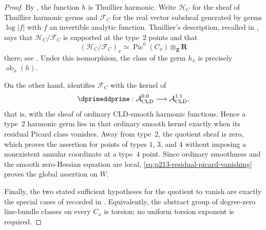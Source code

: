 \begin{proof}
By , the function \(h\) is
Thuillier harmonic.  Write \(\mathcal H_C\) for the sheaf of Thuillier
harmonic germs and \(\mathcal F_C\) for the real vector subsheaf generated
by germs \(\log|f|\) with \(f\) an invertible analytic function.  Thuillier's
description, recalled in , says that
\(\mathcal H_C/\mathcal F_C\) is supported at the type~\(2\) points and
that
\[
       (\mathcal H_C/\mathcal F_C)_x
       \simeq\operatorname{Pic}^0(C_x)\otimes_{\mathbf Z}\mathbf R
\]
there; see \cite[Theorem~2.3.21 and Lemma~2.3.22]{Thu05}.  Under this
isomorphism, the class of the germ \(h_x\) is precisely
\(\operatorname{ob}_x(h)\).

On the other hand, \cite[Remark~15.10]{GJR26} identifies
\(\mathcal F_C\) with the kernel of
\[
 \dprimeddprime:\mathcal A^{0,0}_{\mathrm{CLD}}
                    \longrightarrow\mathcal A^{1,1}_{\mathrm{CLD}},
\]
that is, with the sheaf of ordinary CLD-smooth harmonic functions.  Hence a
type~\(2\) harmonic germ lies in that ordinary smooth kernel exactly when
its residual Picard class vanishes.  Away from type~\(2\), the quotient
sheaf is zero, which proves the assertion for points of types \(1\), \(3\),
and \(4\) without imposing a nonexistent annular coordinate at a type~\(4\)
point.  Since ordinary smoothness and the smooth zero-Hessian equation are
local, \eqref{eq:p213-residual-picard-vanishing} proves the global assertion
on \(W\).

Finally, the two stated sufficient hypotheses for the quotient to vanish
are exactly the special cases of \cite[Theorem~2.3.21]{Thu05} recorded in
.  Equivalently, the abstract group of
degree-zero line-bundle classes on every \(C_x\) is torsion; no uniform
torsion exponent is required.
\end{proof}
